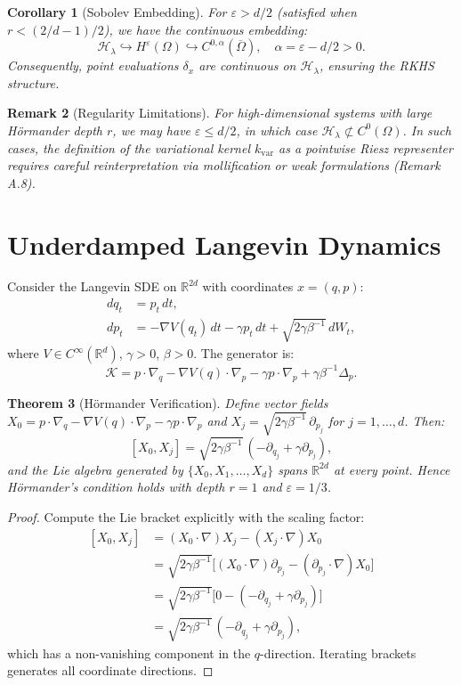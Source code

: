 \documentclass[11pt,a4paper]{article}
\newtheorem{theorem}{Theorem}[section]
\newtheorem{corollary}[theorem]{Corollary}
\newtheorem{remark}[theorem]{Remark}
\begin{document}
\begin{corollary}[Sobolev Embedding]
For $\varepsilon > d/2$ (satisfied when $r < (2/d - 1)/2$), we have the continuous embedding:
\[
\mathcal{H}_\lambda \hookrightarrow H^\varepsilon(\Omega) \hookrightarrow C^{0,\alpha}(\overline{\Omega}), \quad \alpha = \varepsilon - d/2 > 0.
\]
Consequently, point evaluations $\delta_x$ are continuous on $\mathcal{H}_\lambda$, ensuring the RKHS structure.
\end{corollary}

\begin{remark}[Regularity Limitations]
For high-dimensional systems with large H\"{o}rmander depth $r$, we may have $\varepsilon \leq d/2$, in which case $\mathcal{H}_\lambda \not\subset C^0(\Omega)$. In such cases, the definition of the variational kernel $k_{\mathrm{var}}$ as a pointwise Riesz representer requires careful reinterpretation via mollification or weak formulations (Remark A.8).
\end{remark}

\section{Underdamped Langevin Dynamics}

Consider the Langevin SDE on $\mathbb{R}^{2d}$ with coordinates $x = (q,p)$:
\[
\begin{aligned}
dq_t &= p_t\,dt, \\
dp_t &= -\nabla V(q_t)\,dt - \gamma p_t\,dt + \sqrt{2\gamma\beta^{-1}}\,dW_t,
\end{aligned}
\]
where $V \in C^\infty(\mathbb{R}^d)$, $\gamma > 0$, $\beta > 0$. The generator is:
\[
\mathcal{K} = p\cdot\nabla_q - \nabla V(q)\cdot\nabla_p - \gamma p\cdot\nabla_p + \gamma\beta^{-1}\Delta_p.
\]

\begin{theorem}[H\"{o}rmander Verification]
Define vector fields $X_0 = p\cdot\nabla_q - \nabla V(q)\cdot\nabla_p - \gamma p\cdot\nabla_p$ and $X_j = \sqrt{2\gamma\beta^{-1}}\,\partial_{p_j}$ for $j=1,\dots,d$. Then:
\[
[X_0, X_j] = \sqrt{2\gamma\beta^{-1}}\,(-\partial_{q_j} + \gamma\partial_{p_j}),
\]
and the Lie algebra generated by $\{X_0, X_1, \dots, X_d\}$ spans $\mathbb{R}^{2d}$ at every point. Hence H\"{o}rmander's condition holds with depth $r=1$ and $\varepsilon = 1/3$.
\end{theorem}

\begin{proof}
Compute the Lie bracket explicitly with the scaling factor:
\[
\begin{aligned}
[X_0, X_j] 
&= (X_0\cdot\nabla)X_j - (X_j\cdot\nabla)X_0 \\
&= \sqrt{2\gamma\beta^{-1}}\bigl[(X_0\cdot\nabla)\partial_{p_j} - (\partial_{p_j}\cdot\nabla)X_0\bigr] \\
&= \sqrt{2\gamma\beta^{-1}}\bigl[0 - (-\partial_{q_j} + \gamma\partial_{p_j})\bigr] \\
&= \sqrt{2\gamma\beta^{-1}}\,(-\partial_{q_j} + \gamma\partial_{p_j}),
\end{aligned}
\]
which has a non-vanishing component in the $q$-direction. Iterating brackets generates all coordinate directions.
\end{proof}
\end{document}
